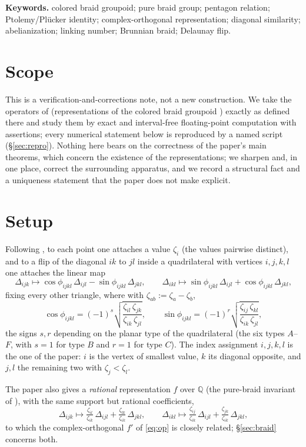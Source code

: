 \documentclass[11pt]{article}
\theoremstyle{plain}
\theoremstyle{definition}
\theoremstyle{remark}
\newcommand{\zk}[2]{\zeta_{#1#2}}
\begin{document}
\smallskip
\noindent\textbf{Keywords.} colored braid groupoid; pure braid group; pentagon relation; Ptolemy/Pl\"ucker
identity; complex-orthogonal representation; diagonal similarity; abelianization; linking number;
Brunnian braid; Delaunay flip.

\section{Scope}
This is a verification-and-corrections note, not a new construction. We take the operators of
\cite{rohozhkin2026} (representations of the colored braid groupoid \cite{licata-vertesi}) exactly as
defined there and study them by exact and interval-free
floating-point computation with assertions; every numerical statement below is reproduced by a
named script (\S\ref{sec:repro}). Nothing here bears on the correctness of the paper's main
theorems, which concern the existence of the representations; we sharpen and, in one place,
correct the surrounding apparatus, and we record a structural fact and a uniqueness statement that
the paper does not make explicit.

\section{Setup}
Following \cite{rohozhkin2026}, to each point one attaches a value $\zeta_i$ (the values pairwise
distinct), and to a flip of the diagonal $ik$ to $jl$ inside a quadrilateral with vertices
$i,j,k,l$ one attaches the linear map
\begin{equation}\label{eq:op}
\Delta_{ijk}\mapsto \cos\phi_{ijkl}\,\Delta_{ijl}-\sin\phi_{ijkl}\,\Delta_{jkl},\qquad
\Delta_{ikl}\mapsto \sin\phi_{ijkl}\,\Delta_{ijl}+\cos\phi_{ijkl}\,\Delta_{jkl},
\end{equation}
fixing every other triangle, where with $\zk ab:=\zeta_a-\zeta_b$,
\[
\cos\phi_{ijkl}=(-1)^{s}\sqrt{\frac{\zk il\,\zk jk}{\zk ik\,\zk jl}},\qquad
\sin\phi_{ijkl}=(-1)^{r}\sqrt{\frac{\zk ij\,\zk kl}{\zk ik\,\zk jl}},
\]
the signs $s,r$ depending on the planar type of the quadrilateral (the six types $A$--$F$, with
$s=1$ for type $B$ and $r=1$ for type $C$). The index assignment $i,j,k,l$ is the one of the
paper: $i$ is the vertex of smallest value, $k$ its diagonal opposite, and $j,l$ the remaining
two with $\zeta_j<\zeta_l$.

The paper also gives a \emph{rational} representation $f$ over $\mathbb{Q}$ (the pure-braid invariant
of \cite{rohozhkin-jktr}), with the same support
but rational coefficients,
\begin{equation}\label{eq:op-rational}
\Delta_{ijk}\mapsto \tfrac{\zk il}{\zk ik}\,\Delta_{ijl}+\tfrac{\zk lk}{\zk ik}\,\Delta_{jkl},\qquad
\Delta_{ikl}\mapsto \tfrac{\zk ij}{\zk ik}\,\Delta_{ijl}+\tfrac{\zk jk}{\zk ik}\,\Delta_{jkl},
\end{equation}
to which the complex-orthogonal $f'$ of \eqref{eq:op} is closely related; \S\ref{sec:braid} concerns
both.
\end{document}
